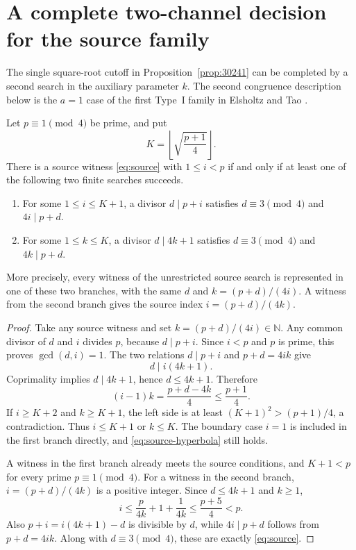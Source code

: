 \section{A complete two-channel decision for the source family}
\label{sec:twochannel}


The single square-root cutoff in Proposition~\ref{prop:30241} can be
completed by a second search in the auxiliary parameter $k$.
The second congruence description below is the $a=1$ case of the
first Type~I family in Elsholtz and Tao
\cite[Proposition~1.9]{ET}.

\begin{theorem}\label{thm:twochannel}
Let $p\equiv1\pmod4$ be prime, and put
\[
 K=\left\lfloor\sqrt{\frac{p+1}{4}}\right\rfloor .
\]
There is a source witness \eqref{eq:source} with $1\le i<p$ if and
only if at least one of the following two finite searches succeeds.
\begin{enumerate}
\item For some $1\le i\le K+1$, a divisor $d\mid p+i$ satisfies
      $d\equiv3\pmod4$ and $4i\mid p+d$.
\item For some $1\le k\le K$, a divisor $d\mid4k+1$ satisfies
      $d\equiv3\pmod4$ and $4k\mid p+d$.
\end{enumerate}
More precisely, every witness of the unrestricted source search is
represented in one of these two branches, with the same $d$ and
$k=(p+d)/(4i)$. A witness from the second branch gives the source
index $i=(p+d)/(4k)$.
\end{theorem}
\begin{proof}
Take any source witness and set $k=(p+d)/(4i)\in\mathbb N$.
Any common divisor of $d$ and $i$ divides $p$, because
$d\mid p+i$. Since $i<p$ and $p$ is prime, this proves
$\gcd(d,i)=1$. The two relations
$d\mid p+i$ and $p+d=4ik$ give
\[
 d\mid i(4k+1).
\]
Coprimality implies $d\mid4k+1$, hence $d\le4k+1$. Therefore
\begin{equation}\label{eq:source-hyperbola}
 (i-1)k=\frac{p+d-4k}{4}\le\frac{p+1}{4}.
\end{equation}
If $i\ge K+2$ and $k\ge K+1$, the left side is at least
$(K+1)^2>(p+1)/4$, a contradiction. Thus $i\le K+1$ or
$k\le K$. The boundary case $i=1$ is included in the first
branch directly, and \eqref{eq:source-hyperbola} still holds.

A witness in the first branch already meets the source conditions,
and $K+1<p$ for every prime $p\equiv1\pmod4$.
For a witness in the second branch, $i=(p+d)/(4k)$ is a positive
integer. Since $d\le4k+1$ and $k\ge1$,
\[
 i\le\frac{p}{4k}+1+\frac1{4k}
   \le\frac{p+5}{4}<p.
\]
Also $p+i=i(4k+1)-d$ is divisible by $d$, while
$4i\mid p+d$ follows from $p+d=4ik$. Along with
$d\equiv3\pmod4$, these are exactly \eqref{eq:source}.
\end{proof}

